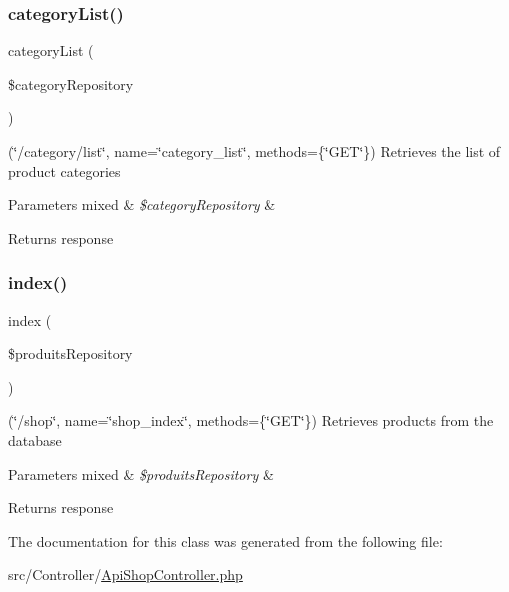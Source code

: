 \subsubsection{\texorpdfstring{category\+List()}{categoryList()}}
{\footnotesize\ttfamily category\+List (\begin{DoxyParamCaption}\item[{\mbox{\hyperlink{class_app_1_1_repository_1_1_category_repository}{Category\+Repository}}}]{\$category\+Repository }\end{DoxyParamCaption})}

(\char`\"{}/category/list\char`\"{}, name=\char`\"{}category\+\_\+list\char`\"{}, methods=\{\char`\"{}\+G\+E\+T\char`\"{}\}) Retrieves the list of product categories


\begin{DoxyParams}[1]{Parameters}
mixed & {\em \$category\+Repository} & \\
\hline
\end{DoxyParams}
\begin{DoxyReturn}{Returns}
response 
\end{DoxyReturn}
\mbox{\label{class_app_1_1_controller_1_1_api_shop_controller_a4b18c8720ede9d5ce2beda028d675d13}} 
\subsubsection{\texorpdfstring{index()}{index()}}
{\footnotesize\ttfamily index (\begin{DoxyParamCaption}\item[{\mbox{\hyperlink{class_app_1_1_repository_1_1_produits_repository}{Produits\+Repository}}}]{\$produits\+Repository }\end{DoxyParamCaption})}

(\char`\"{}/shop\char`\"{}, name=\char`\"{}shop\+\_\+index\char`\"{}, methods=\{\char`\"{}\+G\+E\+T\char`\"{}\}) Retrieves products from the database


\begin{DoxyParams}[1]{Parameters}
mixed & {\em \$produits\+Repository} & \\
\hline
\end{DoxyParams}
\begin{DoxyReturn}{Returns}
response 
\end{DoxyReturn}


The documentation for this class was generated from the following file\+:\begin{DoxyCompactItemize}
\item 
src/\+Controller/\mbox{\hyperlink{_api_shop_controller_8php}{Api\+Shop\+Controller.\+php}}\end{DoxyCompactItemize}
